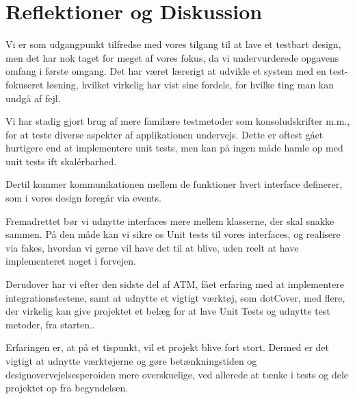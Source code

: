 
\section{Reflektioner og Diskussion}
Vi er som udgangpunkt tilfredse med vores tilgang til at lave et testbart design, men det har nok taget for meget af vores fokus, 
da vi undervurderede opgavens omfang i første omgang. 
Det har været lærerigt at udvikle et system med en test-fokuseret løsning, 
hvilket virkelig har vist sine fordele, for hvilke ting man kan undgå af fejl.

Vi har stadig gjort brug af mere familære testmetoder som konsoludskrifter m.m., for at teste diverse aspekter af applikationen undervejs. 
Dette er oftest gået hurtigere end at implementere unit tests, 
men kan på ingen måde hamle op med unit tests ift skalérbarhed.

Dertil kommer kommunikationen mellem de funktioner hvert interface definerer, 
som i vores design foregår via events.

Fremadrettet bør vi udnytte interfaces mere mellem klasserne, 
der skal snakke sammen. På den måde kan vi sikre os Unit tests til vores interfaces, 
og realisere via fakes, hvordan vi gerne vil have det til at blive, uden reelt at have implementeret noget i forvejen.

Derudover har vi efter den sidste del af ATM, fået erfaring med at implementere integrationstestene, 
samt at udnytte et vigtigt værktøj, som dotCover, med flere, der virkelig kan give projektet et belæg for at lave Unit Tests og udnytte test metoder, fra starten..

Erfaringen er, at på et tispunkt, vil et projekt blive fort stort. 
Dermed er det vigtigt at udnytte værktøjerne og gøre betænkningstiden og designovervejelsesperoiden mere overskuelige, 
ved allerede at tænke i tests og dele projektet op fra begyndelsen.
